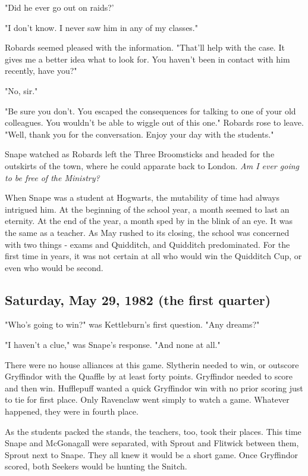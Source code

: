 "Did he ever go out on raids?'

"I don't know. I never saw him in any of my classes."

Robards seemed pleased with the information. "That'll help with the case. It gives me a better idea what to look for. You haven't been in contact with him recently, have you?"

"No, sir."

"Be sure you don't. You escaped the consequences for talking to one of your old colleagues. You wouldn't be able to wiggle out of this one." Robards rose to leave. "Well, thank you for the conversation. Enjoy your day with the students."

Snape watched as Robards left the Three Broomsticks and headed for the outskirts of the town, where he could apparate back to London. \emph{Am I ever going to be free of the Ministry?}

When Snape was a student at Hogwarts, the mutability of time had always intrigued him. At the beginning of the school year, a month seemed to last an eternity. At the end of the year, a month sped by in the blink of an eye. It was the same as a teacher. As May rushed to its closing, the school was concerned with two things - exams and Quidditch, and Quidditch predominated. For the first time in years, it was not certain at all who would win the Quidditch Cup, or even who would be second.

\subsection{Saturday, May 29, 1982 (the first quarter)}

"Who's going to win?" was Kettleburn's first question. "Any dreams?"

"I haven't a clue," was Snape's response. "And none at all."

There were no house alliances at this game. Slytherin needed to win, or outscore Gryffindor with the Quaffle by at least forty points. Gryffindor needed to score and then win. Hufflepuff wanted a quick Gryffindor win with no prior scoring just to tie for first place. Only Ravenclaw went simply to watch a game. Whatever happened, they were in fourth place.

As the students packed the stands, the teachers, too, took their places. This time Snape and McGonagall were separated, with Sprout and Flitwick between them, Sprout next to Snape. They all knew it would be a short game. Once Gryffindor scored, both Seekers would be hunting the Snitch.

